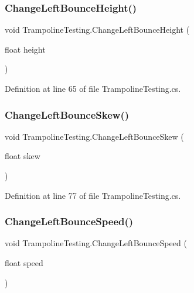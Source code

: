 \subsubsection{\texorpdfstring{Change\+Left\+Bounce\+Height()}{ChangeLeftBounceHeight()}}
{\footnotesize\ttfamily void Trampoline\+Testing.\+Change\+Left\+Bounce\+Height (\begin{DoxyParamCaption}\item[{float}]{height }\end{DoxyParamCaption})}



Definition at line 65 of file Trampoline\+Testing.\+cs.

\mbox{\label{class_trampoline_testing_a0addce0592f7d385d8e45544216464dc}} 
\subsubsection{\texorpdfstring{Change\+Left\+Bounce\+Skew()}{ChangeLeftBounceSkew()}}
{\footnotesize\ttfamily void Trampoline\+Testing.\+Change\+Left\+Bounce\+Skew (\begin{DoxyParamCaption}\item[{float}]{skew }\end{DoxyParamCaption})}



Definition at line 77 of file Trampoline\+Testing.\+cs.

\mbox{\label{class_trampoline_testing_a293dac8cd3d82790db229a2e1516000e}} 
\subsubsection{\texorpdfstring{Change\+Left\+Bounce\+Speed()}{ChangeLeftBounceSpeed()}}
{\footnotesize\ttfamily void Trampoline\+Testing.\+Change\+Left\+Bounce\+Speed (\begin{DoxyParamCaption}\item[{float}]{speed }\end{DoxyParamCaption})}



